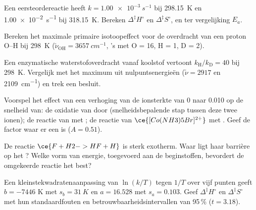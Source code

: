 \begin{exercise}[$\star\star$]\label{exo:b3:rate-theories:5}
Een eersteordereactie heeft $k = \qty{1.00e-3}{s^{-1}}$ bij \qty{298.15}{K} en \qty{1.00e-2}{s^{-1}} bij
\qty{318.15}{K}. Bereken $\Delta^{\ddagger}H^\circ$ en $\Delta^{\ddagger}S^\circ$, en ter vergelijking $E_a$.
\end{exercise}

\begin{exercise}[$\star\star$]\label{exo:b3:rate-theories:6}
Bereken het maximale primaire isotoopeffect voor de overdracht van een
proton O--H bij
\qty{298}{K} ($\tilde\nu_{\mathrm{OH}} = \qty{3657}{cm^{-1}}$, 's met O = 16, H = 1, D = 2).
\end{exercise}

\begin{exercise}[$\star\star$]\label{exo:b3:rate-theories:7}
Een enzymatische waterstofoverdracht vanaf koolstof vertoont $k_{\mathrm H}/k_{\mathrm D} = 40$ bij \qty{298}{K}. Vergelijk
met het maximum uit nulpuntsenergieën ($\tilde\nu = 2917$ en \qty{2109}{cm^{-1}}) en trek een besluit.
\end{exercise}

\begin{exercise}[$\star\star$]\label{exo:b3:rate-theories:8}
Voorspel het effect van een verhoging van de ionsterkte van 0 naar 0.010
op de snelheid van: de oxidatie van  door 
(snelheidsbepalende stap tussen deze twee ionen); de reactie van
 met ; de reactie van $\ce{[Co(NH3)5Br]^{2+}}$ met .
Geef de factor waar er een is ($A = 0.51$).
\end{exercise}

\begin{exercise}[$\star\star$]\label{exo:b3:rate-theories:9}
De reactie $\ce{F + H2 -> HF + H}$ is sterk exotherm. Waar ligt haar
barrière op het ? Welke vorm van energie,
toegevoerd aan de beginstoffen, bevordert de omgekeerde reactie het best?
\end{exercise}

\begin{exercise}[$\star\star\star$]\label{exo:b3:rate-theories:10}
Een kleinstekwadratenaanpassing van $\ln(k/T)$ tegen $1/T$ over vijf punten geeft $b = -7446$ K
met $s_b = \qty{31}{K}$ en $a = 16.528$ met $s_a = 0.103$. Geef $\Delta^{\ddagger}H^\circ$ en $\Delta^{\ddagger}S^\circ$ met
hun standaardfouten en betrouwbaarheidsintervallen van 95\,\% ($t = 3.18$).
\end{exercise}

